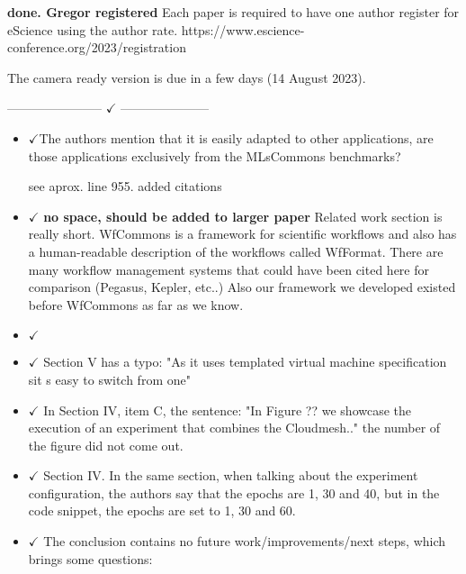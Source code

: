 
\newcommand{\OK}{$\checkmark$}
\newcommand{\ok}{$\checkmark$}

{\bf done. Gregor registered} Each paper is required to have one author register for eScience using the author rate. https://www.escience-conference.org/2023/registration


The camera ready version is due in a few days (14 August 2023). 

----------------------- \OK {} ---------------------

\begin{itemize}
\item  \ok \DONE{}The authors mention that it is easily adapted to other applications, are those applications exclusively from the MLsCommons benchmarks?

see aprox. line 955. added citations \cite{las-22-arxiv-workflow-cc,las-22-mlcommons-science}


\item \OK \DONE{} {\bf no space, should be added to larger paper} Related work section is really short. WfCommons is a framework for scientific workflows and also has a human-readable description of the workflows called WfFormat. There are many workflow management systems that could have been cited here for comparison (Pegasus, Kepler, etc..) Also our framework we developed existed before WfCommons as far as we know.

\item \OK {}

\item \OK {} Section V has a typo: "As it uses templated virtual machine specification sit s easy to switch from one"

\item \OK \DONE{} In Section IV, item C, the sentence: "In Figure ?? we showcase the execution of an experiment that combines the Cloudmesh.." the number of the figure did not come out. 

\item \OK \DONE{} Section IV. In the same section, when talking about the experiment configuration, the authors say that the epochs are 1, 30 and 40, but in the code snippet, the epochs are set to 1, 30 and 60.

\item \OK {} The conclusion contains no future work/improvements/next steps, which brings some questions:


\end{itemize}
